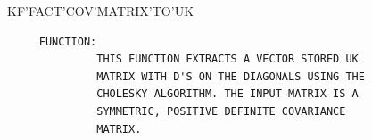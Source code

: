 \begin{frame}
KF'FACT'COV'MATRIX'TO'UK
\begin{verbatim}
     FUNCTION:
              THIS FUNCTION EXTRACTS A VECTOR STORED UK
              MATRIX WITH D'S ON THE DIAGONALS USING THE
              CHOLESKY ALGORITHM. THE INPUT MATRIX IS A
              SYMMETRIC, POSITIVE DEFINITE COVARIANCE
              MATRIX.


\end{verbatim}
\end{frame}
